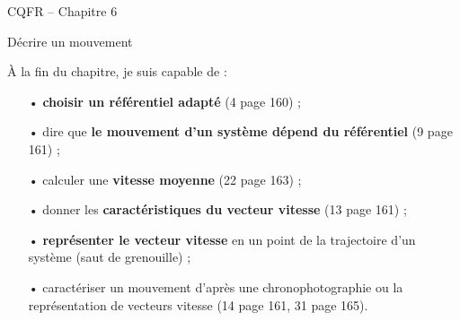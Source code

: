 \documentclass[12pt,a5paper]{article}
\begin{document}
\begin{header}
CQFR -- Chapitre 6

Décrire un mouvement
\end{header}

À la fin du chapitre, je suis capable de :
\begin{itemize}
\item[•] \textbf{choisir un référentiel adapté} (4 page 160) ;

\item[•] dire que \textbf{le mouvement d'un système dépend du référentiel} (9 page 161) ;

\item[•] calculer une \textbf{vitesse moyenne} (22 page 163) ;

\item[•] donner les \textbf{caractéristiques du vecteur vitesse} (13 page 161) ;

\item[•] \textbf{représenter le vecteur vitesse} en un point de la trajectoire d'un système (saut de grenouille) ;

\item[•] caractériser un mouvement d'après une chronophotographie ou la représentation de vecteurs vitesse (14 page 161, 31 page 165).
\end{itemize}
\end{document}
